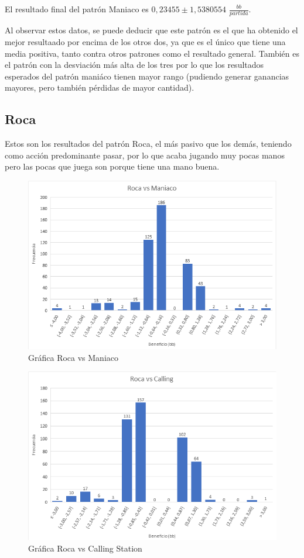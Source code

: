 El resultado final del patrón Maniaco es $0,23455\pm1,5380554$ $\frac{bb}{partida}$.

Al observar estos datos, se puede deducir que este patrón es el que ha obtenido el mejor resultaado por encima de los otros dos, ya que es el único que tiene una media positiva, tanto contra otros patrones como el resultado general. También es el patrón con la desviación más alta de los tres por lo que los resultados esperados del patrón maniáco tienen mayor rango (pudiendo generar ganancias mayores, pero también pérdidas de mayor cantidad).

\newpage

\subsection{Roca}

Estos son los resultados del patrón Roca, el más pasivo que los demás, teniendo como acción predominante pasar, por lo que acaba jugando muy pocas manos pero las pocas que juega son porque tiene una mano buena.

\begin{figure}[h]
\centering
\includegraphics[width=1\textwidth]{figuras/RvM.png}   
\caption{Gráfica Roca vs Maniaco}
\label{fig:RvM}
\end{figure}

\begin{figure}[h]
\centering
\includegraphics[width=1\textwidth]{figuras/RvC.png}   
\caption{Gráfica Roca vs Calling Station}
\label{fig:RvC}
\end{figure}

